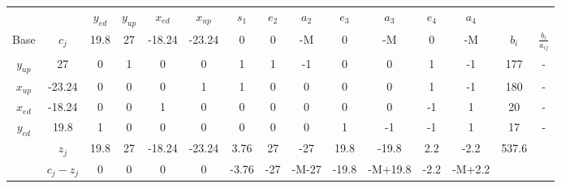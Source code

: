 \begin{table}[ht]
	\centering
        \begin{tabular}{ cc|ccccccccccc|cc }
        	& & $y_{ed}$ & $y_{up}$ & $x_{ed}$ & $x_{up}$ & $s_1$ & $e_2$ & $a_2$ & $e_3$ & $a_3$ & $e_4$ & $a_4$ & &\\
        	Base & $c_j$ & 19.8 & 27 & -18.24 & -23.24 & 0 & 0 & -M & 0 & -M & 0 & -M & $b_i$ & $\frac{b_i}{a_{ij}}$\\
        	\hline
                $y_{up}$ & 27     & 0  & 1  & 0  & 0  & 1  & 1  & -1 & 0  & 0   & 1  & -1  & 177 & -         \\
                $x_{up}$ & -23.24 & 0  & 0  & 0  & 1  & 1  & 0  & 0  & 0  & 0   & 1  & -1  & 180 & -         \\
                $x_{ed}$ & -18.24 & 0  & 0  & 1  & 0  & 0  & 0  & 0  & 0  & 0   & -1 & 1   & 20  & -         \\
                $y_{ed}$ & 19.8   & 1  & 0  & 0  & 0  & 0  & 0  & 0  & 1  & -1  & -1 & 1   & 17  & -         \\
                \hline
                & $z_j$       & 19.8 & 27    & -18.24 & -23.24 & 3.76 & 27 & -27 & 19.8 & -19.8 & 2.2 & -2.2 & 537.6 & \\ 
                & $c_j - z_j$ & 0  & 0 & 0 & 0 & -3.76 & -27 & -M-27 & -19.8 & -M+19.8 & -2.2 & -M+2.2 & &\\ 
        \end{tabular}
\end{table}
